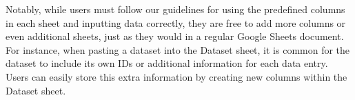 
Notably, while users must follow our guidelines for using the predefined columns in each sheet and inputting data correctly, they are free to add more columns or even additional sheets, just as they would in a regular Google Sheets document. 
For instance, when pasting a dataset into the Dataset sheet, it is common for the dataset to include its own IDs or additional information for each data entry. 
Users can easily store this extra information by creating new columns within the Dataset sheet.



\begin{comment}



\subsubsection{Other Features} \steven{todo: add figures in the appendix. screenshots for different notification messages. interface screenshots for removal and clearing.}
\begin{itemize}
    \item \textbf{Real-Time System Notification: }\system provides a notification feature that informs users of its current processes, such as ``Data Indexing'', ``Data Sampling'', ``Generating the Instructional Prompt'', ``Annotating'', etc.
    \item \textbf{Remove Unselected Data Instance (Figure \ref{fig:remove-clear}): }This function will remove data instances that do not have the ``Keep it in the next data sample'' checked in the ``Working Data Sample'' tab.
    \item \textbf{Clear Data Instance (Figure \ref{fig:remove-clear}): }This function will clear all data instances in the ``Working Data Sample'' tab.
\end{itemize}

    
\end{comment}